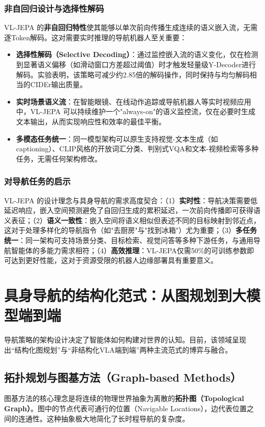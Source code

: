 \subsubsection{非自回归设计与选择性解码}
VL-JEPA 的\textbf{非自回归特性}使其能够以单次前向传播生成连续的语义嵌入流，无需逐Token解码。这对需要实时推理的导航机器人至关重要：
\begin{itemize}
    \item \textbf{选择性解码（Selective Decoding）}：通过监控嵌入流的语义变化，仅在检测到显著语义偏移（如滑动窗口方差超过阈值）时才触发轻量级Y-Decoder进行解码。实验表明，该策略可减少约2.85倍的解码操作，同时保持与均匀解码相当的CIDEr输出质量。
    \item \textbf{实时场景语义流}：在智能眼镜、在线动作追踪或导航机器人等实时视频应用中，VL-JEPA 可以持续维护一个"always-on"的语义监控流，仅在必要时生成文本输出，从而实现响应性和效率的最佳平衡。
    \item \textbf{多模态任务统一}：同一模型架构可以原生支持视觉-文本生成（如captioning）、CLIP风格的开放词汇分类、判别式VQA和文本-视频检索等多种任务，无需任何架构修改。
\end{itemize}

\subsubsection{对导航任务的启示}
VL-JEPA 的设计理念与具身导航的需求高度契合：（1）\textbf{实时性}：导航决策需要低延迟响应，嵌入空间预测避免了自回归生成的累积延迟，一次前向传播即可获得语义表征；（2）\textbf{语义一致性}：嵌入空间将语义相似但表述不同的目标映射到邻近点，这对于处理多样化的导航指令（如"去厨房"与"找到冰箱"）尤为重要；（3）\textbf{多任务统一}：同一架构可支持场景分类、目标检索、视觉问答等多种下游任务，与通用导航智能体的多能力需求相符；（4）\textbf{高效推理}：VL-JEPA仅需50\%的可训练参数即可达到更好性能，这对于资源受限的机器人边缘部署具有重要意义。

\section{具身导航的结构化范式：从图规划到大模型端到端}
导航策略的架构设计决定了智能体如何构建对世界的认知。目前，该领域呈现出“结构化图规划”与“非结构化VLA端到端”两种主流范式的博弈与融合。

\subsection{拓扑规划与图基方法（Graph-based Methods）}
图基方法的核心理念是将连续的物理世界抽象为离散的\textbf{拓扑图（Topological Graph）}。图中的节点代表可通行的位置（Navigable Locations），边代表位置之间的连通性。这种抽象极大地简化了长时程导航的复杂度。

